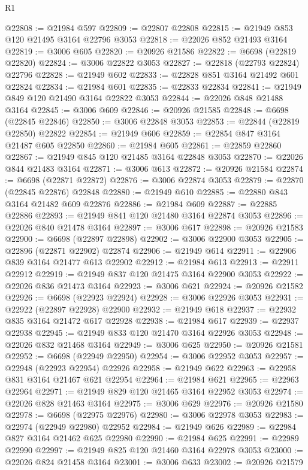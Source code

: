 \begin{lexlean}{R1}
\begin{coremodule}
@22808 := @21984 @597
@22809 := @22807 @22808
@22815 := @21949 @853 @120 @21495 @3164 @22796 @3053
@22818 := @22026 @852 @21493 @3164
@22819 := @3006 @605
@22820 := @20926 @21586
@22822 := @6698 (@22819 @22820)
@22824 := @3006 @22822 @3053
@22827 := @22818 (@22793 @22824) @22796
@22828 := @21949 @602
@22833 := @22828 @851 @3164 @21492 @601 @22824
@22834 := @21984 @601
@22835 := @22833 @22834
@22841 := @21949 @849 @120 @21490 @3164 @22822 @3053
@22844 := @22026 @848 @21488 @3164
@22845 := @3006 @609
@22846 := @20926 @21585
@22848 := @6698 (@22845 @22846)
@22850 := @3006 @22848 @3053
@22853 := @22844 (@22819 @22850) @22822
@22854 := @21949 @606
@22859 := @22854 @847 @3164 @21487 @605 @22850
@22860 := @21984 @605
@22861 := @22859 @22860
@22867 := @21949 @845 @120 @21485 @3164 @22848 @3053
@22870 := @22026 @844 @21483 @3164
@22871 := @3006 @613
@22872 := @20926 @21584
@22874 := @6698 (@22871 @22872)
@22876 := @3006 @22874 @3053
@22879 := @22870 (@22845 @22876) @22848
@22880 := @21949 @610
@22885 := @22880 @843 @3164 @21482 @609 @22876
@22886 := @21984 @609
@22887 := @22885 @22886
@22893 := @21949 @841 @120 @21480 @3164 @22874 @3053
@22896 := @22026 @840 @21478 @3164
@22897 := @3006 @617
@22898 := @20926 @21583
@22900 := @6698 (@22897 @22898)
@22902 := @3006 @22900 @3053
@22905 := @22896 (@22871 @22902) @22874
@22906 := @21949 @614
@22911 := @22906 @839 @3164 @21477 @613 @22902
@22912 := @21984 @613
@22913 := @22911 @22912
@22919 := @21949 @837 @120 @21475 @3164 @22900 @3053
@22922 := @22026 @836 @21473 @3164
@22923 := @3006 @621
@22924 := @20926 @21582
@22926 := @6698 (@22923 @22924)
@22928 := @3006 @22926 @3053
@22931 := @22922 (@22897 @22928) @22900
@22932 := @21949 @618
@22937 := @22932 @835 @3164 @21472 @617 @22928
@22938 := @21984 @617
@22939 := @22937 @22938
@22945 := @21949 @833 @120 @21470 @3164 @22926 @3053
@22948 := @22026 @832 @21468 @3164
@22949 := @3006 @625
@22950 := @20926 @21581
@22952 := @6698 (@22949 @22950)
@22954 := @3006 @22952 @3053
@22957 := @22948 (@22923 @22954) @22926
@22958 := @21949 @622
@22963 := @22958 @831 @3164 @21467 @621 @22954
@22964 := @21984 @621
@22965 := @22963 @22964
@22971 := @21949 @829 @120 @21465 @3164 @22952 @3053
@22974 := @22026 @828 @21463 @3164
@22975 := @3006 @629
@22976 := @20926 @21580
@22978 := @6698 (@22975 @22976)
@22980 := @3006 @22978 @3053
@22983 := @22974 (@22949 @22980) @22952
@22984 := @21949 @626
@22989 := @22984 @827 @3164 @21462 @625 @22980
@22990 := @21984 @625
@22991 := @22989 @22990
@22997 := @21949 @825 @120 @21460 @3164 @22978 @3053
@23000 := @22026 @824 @21458 @3164
@23001 := @3006 @633
@23002 := @20926 @21579

\end{coremodule}
\end{lexlean}
